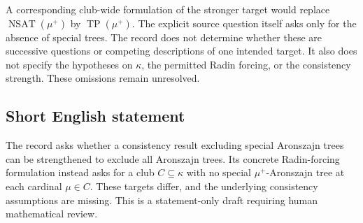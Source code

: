 \documentclass[11pt]{article}
\begin{document}
A corresponding club-wide formulation of the stronger target would replace \(\operatorname{NSAT}(\mu^{+})\) by \(\operatorname{TP}(\mu^{+})\). The explicit source question itself asks only for the absence of special trees. The record does not determine whether these are successive questions or competing descriptions of one intended target. It also does not specify the hypotheses on \(\kappa\), the permitted Radin forcing, or the consistency strength. These omissions remain unresolved.
\subsection{Short English statement}
The record asks whether a consistency result excluding special Aronszajn trees can be strengthened to exclude all Aronszajn trees. Its concrete Radin-forcing formulation instead asks for a club \(C\subseteq\kappa\) with no special \(\mu^{+}\)-Aronszajn tree at each cardinal \(\mu\in C\). These targets differ, and the underlying consistency assumptions are missing. This is a statement-only draft requiring human mathematical review.
\end{document}

